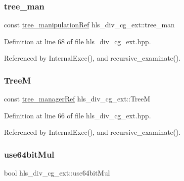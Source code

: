 \subsubsection{\texorpdfstring{tree\+\_\+man}{tree\_man}}
{\footnotesize\ttfamily const \hyperlink{tree__manipulation_8hpp_a1a9460e3a2f9fc6a96cfd2f24cc9b2a5}{tree\+\_\+manipulation\+Ref} hls\+\_\+div\+\_\+cg\+\_\+ext\+::tree\+\_\+man\hspace{0.3cm}{\ttfamily [protected]}}



Definition at line 68 of file hls\+\_\+div\+\_\+cg\+\_\+ext.\+hpp.



Referenced by Internal\+Exec(), and recursive\+\_\+examinate().

\mbox{\label{classhls__div__cg__ext_a677d64ea74f1d936612ff1de36786ed6}} 
\subsubsection{\texorpdfstring{TreeM}{TreeM}}
{\footnotesize\ttfamily const \hyperlink{tree__manager_8hpp_a96ff150c071ce11a9a7a1e40590f205e}{tree\+\_\+manager\+Ref} hls\+\_\+div\+\_\+cg\+\_\+ext\+::\+TreeM\hspace{0.3cm}{\ttfamily [protected]}}



Definition at line 66 of file hls\+\_\+div\+\_\+cg\+\_\+ext.\+hpp.



Referenced by Internal\+Exec(), and recursive\+\_\+examinate().

\mbox{\label{classhls__div__cg__ext_a5082c6a12744c4720f759f163a00e1be}} 
\subsubsection{\texorpdfstring{use64bit\+Mul}{use64bitMul}}
{\footnotesize\ttfamily bool hls\+\_\+div\+\_\+cg\+\_\+ext\+::use64bit\+Mul\hspace{0.3cm}{\ttfamily [protected]}}



